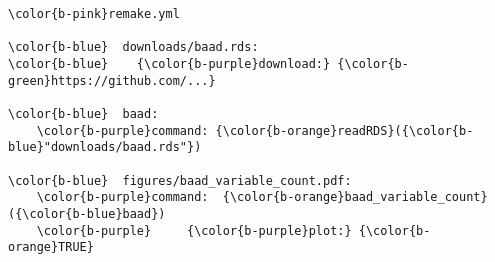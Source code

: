\documentclass[class=minimal,border=0]{standalone}
\begin{document}
%
\begin{BVerbatim}[bgcolor=b-darkgrey]
\color{b-pink}remake.yml

\color{b-blue}  downloads/baad.rds:
\color{b-blue}    {\color{b-purple}download:} {\color{b-green}https://github.com/...}

\color{b-blue}  baad:
    \color{b-purple}command: {\color{b-orange}readRDS}({\color{b-blue}"downloads/baad.rds"})

\color{b-blue}  figures/baad_variable_count.pdf:
    \color{b-purple}command:  {\color{b-orange}baad_variable_count}({\color{b-blue}baad})
    \color{b-purple}     {\color{b-purple}plot:} {\color{b-orange}TRUE}

\end{BVerbatim}
\end{document}
